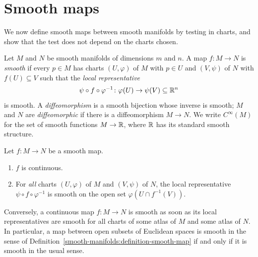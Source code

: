 \section{Smooth maps}\label{smooth-manifolds:section-smooth-maps}

We now define smooth maps between smooth manifolds by testing in charts, and show that the test does not depend on the charts chosen.

\begin{definition}\label{smooth-manifolds:definition-smooth-map}
Let $M$ and $N$ be smooth manifolds of dimensions $m$ and $n$. A map $f \colon M \to N$ is \emph{smooth} if every $p \in M$ has charts $(U, \varphi)$ of $M$ with
$p \in U$ and $(V, \psi)$ of $N$ with $f(U) \subseteq V$ such that the \emph{local representative}
\[
\psi \circ f \circ \varphi^{-1} \colon \varphi(U) \to \psi(V) \subseteq \mathbb{R}^n
\]
is smooth. A \emph{diffeomorphism} is a smooth bijection whose inverse is smooth; $M$ and $N$ are \emph{diffeomorphic} if there is a diffeomorphism
$M \to N$. We write $C^\infty(M)$ for the set of smooth functions $M \to \mathbb{R}$, where $\mathbb{R}$ has its standard smooth structure.
\end{definition}

\begin{lemma}\label{smooth-manifolds:lemma-smooth-independent}
Let $f \colon M \to N$ be a smooth map.
\begin{enumerate}
\item $f$ is continuous.
\item For \emph{all} charts $(U, \varphi)$ of $M$ and $(V, \psi)$ of $N$, the local representative $\psi \circ f \circ \varphi^{-1}$ is smooth on the open set
$\varphi(U \cap f^{-1}(V))$.
\end{enumerate}
Conversely, a continuous map $f \colon M \to N$ is smooth as soon as its local representatives are smooth for all charts of some atlas of $M$ and some atlas of
$N$. In particular, a map between open subsets of Euclidean spaces is smooth in the sense of Definition~\ref{smooth-manifolds:definition-smooth-map} if and only
if it is smooth in the usual sense.
\end{lemma}

